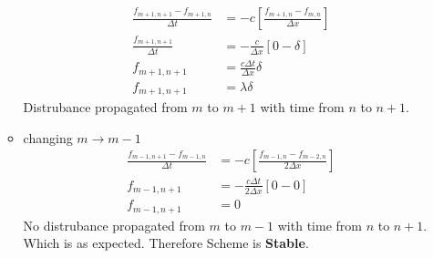 \documentclass[fleqn,10pt]{SelfArx} %
\begin{document}
\begin{enumerate}
\begin{itemize}
			\begin{align*}
				\frac{f_{m+1,n+1} - f_{m+1,n}}{\Delta t} &= -c\left[\frac{f_{m+1,n} - f_{m,n}}{\Delta x}\right] \\
				\frac{f_{m+1,n+1}}{\Delta t} &= -\frac{c}{\Delta x}\left[0-\delta\right] \\
				f_{m+1,n+1} &= \frac{c\Delta t}{\Delta x}\delta \\
				f_{m+1,n+1} &= \lambda\delta \tag{19.6} \label{eq:19.6}
			\end{align*}
			Distrubance propagated from \( m \) to \( m+1 \) with time from \( n \) to \( n +1 \).
			\item changing \( m \rightarrow m-1 \)
			\begin{align*}
				\frac{f_{m-1,n+1} - f_{m-1,n}}{\Delta t} &= -c\left[\frac{f_{m-1,n} - f_{m-2,n}}{2\Delta x}\right] \\
				f_{m-1,n+1} &= -\frac{c\Delta t}{2\Delta x}[0 - 0 ] \\
				f_{m-1,n+1} &= 0 \tag{19.7} \label{eq:19.7}
			\end{align*}
			No distrubance propagated from \( m \) to \( m-1 \) with time from \( n \) to \( n +1 \). \\
			Which is as expected. Therefore Scheme is \textbf{Stable}.
		\end{itemize}
\end{enumerate}

\clearpage



\end{document}
